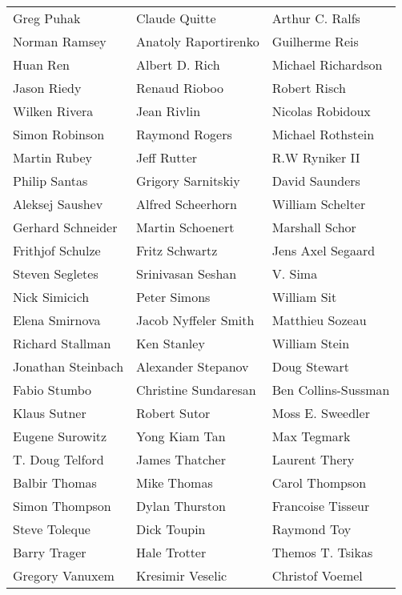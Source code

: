 \begin{tabular}{lll}
Greg Puhak             & Claude Quitte          & Arthur C. Ralfs\\
Norman Ramsey          & Anatoly Raportirenko   & Guilherme Reis\\
Huan Ren               & Albert D. Rich         & Michael Richardson\\
Jason Riedy            & Renaud Rioboo          & Robert Risch\\
Wilken Rivera          & Jean Rivlin            & Nicolas Robidoux\\
Simon Robinson         & Raymond Rogers         & Michael Rothstein\\
Martin Rubey           & Jeff Rutter            & R.W Ryniker II\\
Philip Santas          & Grigory Sarnitskiy     & David Saunders\\
Aleksej Saushev        & Alfred Scheerhorn      & William Schelter\\
Gerhard Schneider      & Martin Schoenert       & Marshall Schor\\
Frithjof Schulze       & Fritz Schwartz         & Jens Axel Segaard\\
Steven Segletes        & Srinivasan Seshan      & V. Sima\\
Nick Simicich          & Peter Simons           & William Sit\\
Elena Smirnova         & Jacob Nyffeler Smith   & Matthieu Sozeau\\
Richard Stallman       & Ken Stanley            & William Stein\\
Jonathan Steinbach     & Alexander Stepanov     & Doug Stewart\\
Fabio Stumbo           & Christine Sundaresan   & Ben Collins-Sussman\\
Klaus Sutner           & Robert Sutor           & Moss E. Sweedler\\
Eugene Surowitz        & Yong Kiam Tan          & Max Tegmark\\
T. Doug Telford        & James Thatcher         & Laurent Thery\\
Balbir Thomas          & Mike Thomas            & Carol Thompson\\
Simon Thompson         & Dylan Thurston         & Francoise Tisseur\\
Steve Toleque          & Dick Toupin            & Raymond Toy\\
Barry Trager           & Hale Trotter           & Themos T. Tsikas\\
Gregory Vanuxem        & Kresimir Veselic       & Christof Voemel\\

\end{tabular}
